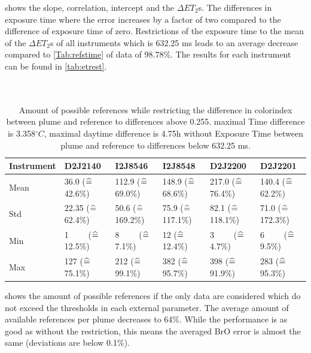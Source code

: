  shows the slope, correlation, intercept and the $\Delta ET_{2}$s. The differences in exposure time where the  error increases by a factor of two compared to the difference of exposure time of zero.
Restrictions of the exposure time to the mean of the $\Delta ET_{2}$s of all instruments which is 632.25 ms leads to an average decrease compared to \cref{Tab:refstime} of data of 98.78\%. The results for each instrument can be found in \cref{tab:etrest}.\\
\\
\\
\begin{table}
	\centering
	\begin{tabular}{|p{1.8cm}|p{2.15cm}|p{2.15cm}|p{2.15cm}|p{2.15cm}|p{2.15cm}|}
		Instrument	&D2J2140&I2J8546& I2J8548&D2J2200&D2J2201\\
		\toprule
		Mean&
		36.0 ($\mathrel{\widehat{=}}\,$42.6\%)&	112.9 ($\mathrel{\widehat{=}}\,$69.0\%)&
		148.9 ($\mathrel{\widehat{=}}\,$68.6\%)&	217.0 ($\mathrel{\widehat{=}}\,$76.4\%)&	140.4 ($\mathrel{\widehat{=}}\,$62.2\%)\\
		\midrule
		Std&
		22.35 ($\mathrel{\widehat{=}}\,$62.4\%)&
		50.6 ($\mathrel{\widehat{=}}\,$169.2\%) &
		75.9 ($\mathrel{\widehat{=}}\,$117.1\%)&
		82.1 ($\mathrel{\widehat{=}}\,$118.1\%) &
		71.0 ($\mathrel{\widehat{=}}\,$172.3\%) \\
		\midrule
		Min&
		1$\qquad$ ($\mathrel{\widehat{=}}\,$12.5\%)  &
		8$\qquad$ ($\mathrel{\widehat{=}}\,$7.1\%)  &
		12 ($\mathrel{\widehat{=}}\,$12.4\%)  &
		3$\qquad$ ($\mathrel{\widehat{=}}\,$4.7\%)   &
		6$\qquad$ ($\mathrel{\widehat{=}}\,$9.5\%)  \\
		\midrule
		Max
		&127 ($\mathrel{\widehat{=}}\,$75.1\%)
		&212 ($\mathrel{\widehat{=}}\,$99.1\%)
		&382 ($\mathrel{\widehat{=}}\,$95.7\%)
		&398 ($\mathrel{\widehat{=}}\,$91.9\%)
		&283 ($\mathrel{\widehat{=}}\,$95.3\%)\\
		\bottomrule
	\end{tabular}
	\label{tab:restrictall}
	\caption{Amount of possible references while restricting the difference in colorindex  between plume and reference to differences above 0.255. maximal Time difference is 3.358$^{\circ}C$, maximal daytime difference is 4.75h without Exposure Time  between plume and reference to differences below 632.25 ms.}
\end{table}	
 shows the amount of possible references if the only data are considered which do not exceed the thresholds in each external parameter.  The average amount of available references per plume decreases to 64\%. While the performance is as good as without the restriction, this means the averaged BrO error is almost the same (deviations are below 0.1\%).


